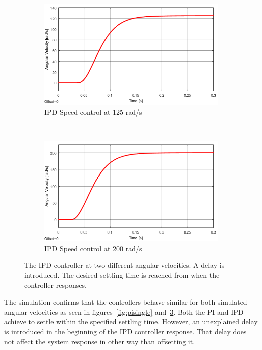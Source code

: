\begin{figure}[h!]
	\centering
	\begin{subfigure}[b]{0.45\textwidth}
		\includegraphics[width=\textwidth]{graphics/IPD_single125}
		\caption{IPD Speed control at 125 rad/s}
		\label{fig:ipdsingle125}
	\end{subfigure}
	~ %
	\begin{subfigure}[b]{0.45\textwidth}
		\includegraphics[width=\textwidth]{graphics/IPD_single200}
		\caption{IPD Speed control at 200 rad/s}
		\label{fig:ipdsingle200}
	\end{subfigure}
	\caption{The IPD controller at two different angular velocities. A delay is introduced. The desired settling time is reached from when the controller responses.}\label{fig:ipdsingle}
\end{figure}


The simulation confirms that the controllers behave similar for both simulated angular velocities as seen in figures~\ref{fig:pisingle} and~\ref{fig:ipdsingle}. Both the PI and IPD achieve to settle within the specified settling time. However, an unexplained delay is introduced in the beginning of the IPD controller response. That delay does not affect the system response in other way than offsetting it.


